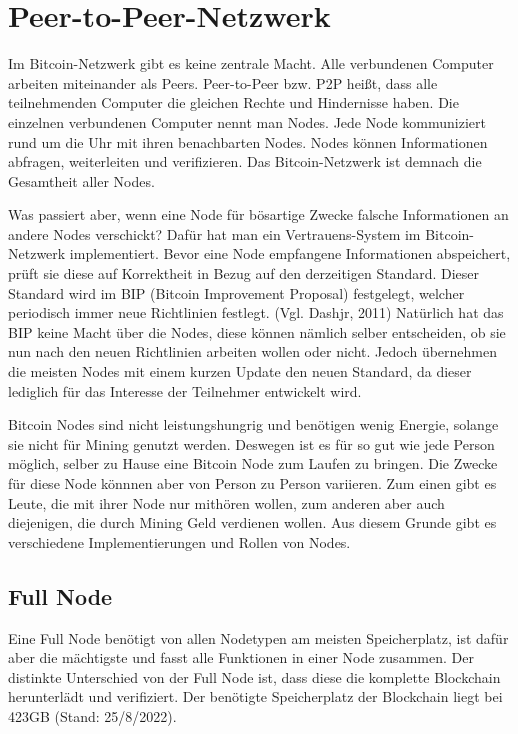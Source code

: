 \section{Peer-to-Peer-Netzwerk}
Im Bitcoin-Netzwerk gibt es keine zentrale Macht. Alle verbundenen Computer arbeiten miteinander als Peers. Peer-to-Peer
bzw. P2P heißt, dass alle teilnehmenden Computer die gleichen Rechte und Hindernisse haben. Die einzelnen verbundenen Computer
nennt man Nodes. Jede Node kommuniziert rund um die Uhr mit ihren benachbarten Nodes. Nodes können Informationen abfragen, 
weiterleiten und verifizieren. Das Bitcoin-Netzwerk ist demnach die Gesamtheit aller Nodes.

Was passiert aber, wenn eine Node für bösartige Zwecke falsche Informationen an andere Nodes verschickt? Dafür hat man ein
Vertrauens-System im Bitcoin-Netzwerk implementiert. Bevor eine Node empfangene Informationen abspeichert, prüft sie diese
auf Korrektheit in Bezug auf den derzeitigen Standard. Dieser Standard wird im BIP (Bitcoin Improvement Proposal) festgelegt,
welcher periodisch immer neue Richtlinien festlegt. (Vgl. Dashjr, 2011) Natürlich hat das BIP keine Macht über die Nodes, diese können nämlich
selber entscheiden, ob sie nun nach den neuen Richtlinien arbeiten wollen oder nicht. Jedoch übernehmen die meisten Nodes mit
einem kurzen Update den neuen Standard, da dieser lediglich für das Interesse der Teilnehmer entwickelt wird.

Bitcoin Nodes sind nicht leistungshungrig und benötigen wenig Energie, solange sie nicht für Mining genutzt werden. Deswegen ist
es für so gut wie jede Person möglich,
selber zu Hause eine Bitcoin Node zum Laufen zu bringen. Die Zwecke für diese Node könnnen aber von Person zu Person variieren.
Zum einen gibt es Leute, die mit ihrer Node nur mithören wollen, zum anderen aber auch diejenigen, die durch Mining Geld
verdienen wollen. Aus diesem Grunde gibt es verschiedene Implementierungen und Rollen von Nodes.

\subsection{Full Node}
Eine Full Node benötigt von allen Nodetypen am meisten Speicherplatz, ist dafür aber die mächtigste und fasst alle Funktionen in 
einer Node zusammen. Der distinkte Unterschied von der Full Node ist, dass diese die komplette Blockchain herunterlädt und
verifiziert. Der benötigte Speicherplatz der Blockchain liegt bei 423GB (Stand: 25/8/2022).

